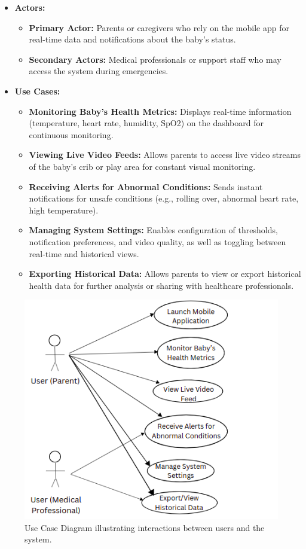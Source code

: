 \documentclass[12pt,a4paper]{report}
\begin{document}
\begin{itemize}
  \item \textbf{Actors:} 
  \begin{itemize}
    \item \textbf{Primary Actor:} Parents or caregivers who rely on the mobile app for real-time data and notifications about the baby's status.
    \item \textbf{Secondary Actors:} Medical professionals or support staff who may access the system during emergencies.
  \end{itemize}
  
  \item \textbf{Use Cases:}
  \begin{itemize}
    \item \textbf{Monitoring Baby’s Health Metrics:} Displays real-time information (temperature, heart rate, humidity, SpO2) on the dashboard for continuous monitoring.
    \item \textbf{Viewing Live Video Feeds:} Allows parents to access live video streams of the baby’s crib or play area for constant visual monitoring.
    \item \textbf{Receiving Alerts for Abnormal Conditions:} Sends instant notifications for unsafe conditions (e.g., rolling over, abnormal heart rate, high temperature).
    \item \textbf{Managing System Settings:} Enables configuration of thresholds, notification preferences, and video quality, as well as toggling between real-time and historical views.
    \item \textbf{Exporting Historical Data:} Allows parents to view or export historical health data for further analysis or sharing with healthcare professionals.
  \end{itemize}
\end{itemize}

\begin{figure}[hbtp]
  \centering
  \includegraphics[scale=0.6]{./pic/usercase.png}
  \caption{Use Case Diagram illustrating interactions between users and the system.}
  \label{fig:usecase}
\end{figure}
\end{document}
